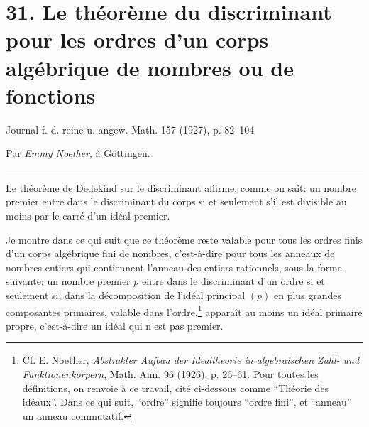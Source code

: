 \setcounter{footnote}{0}

\providecommand{\ma}{\mathfrak a}
\providecommand{\mb}{\mathfrak b}
\providecommand{\mc}{\mathfrak c}
\providecommand{\mo}{\mathfrak o}
\providecommand{\mO}{\mathfrak O}
\providecommand{\mP}{\mathfrak P}
\providecommand{\mR}{\mathfrak R}
\providecommand{\mT}{\mathfrak T}
\providecommand{\mX}{\mathfrak X}
\providecommand{\mZ}{\mathfrak Z}
\providecommand{\mq}{\mathfrak q}
\providecommand{\mt}{\mathfrak t}
\providecommand{\mpideal}{\mathfrak p}
\providecommand{\ba}{\overline{\mathfrak a}}
\providecommand{\bp}{\overline{\mathfrak p}}
\providecommand{\bP}{\overline P}
\providecommand{\bR}{\overline{\mathfrak R}}

\section*{31. Le théorème du discriminant pour les ordres d'un corps algébrique de nombres ou de fonctions}

\begin{center}
Journal f. d. reine u. angew. Math. 157 (1927), p. 82--104

Par \emph{Emmy Noether}, à Göttingen.\\[0.4em]
\rule{9em}{0.4pt}
\end{center}

Le théorème de Dedekind sur le discriminant affirme, comme on sait: un nombre premier entre dans le discriminant du corps si et seulement s'il est divisible au moins par le carré d'un idéal premier.

Je montre dans ce qui suit que ce théorème reste valable pour tous les ordres finis d'un corps algébrique fini de nombres, c'est-à-dire pour tous les anneaux de nombres entiers qui contiennent l'anneau des entiers rationnels, sous la forme suivante: un nombre premier $p$ entre dans le discriminant d'un ordre si et seulement si, dans la décomposition de l'idéal principal $(p)$ en plus grandes composantes primaires, valable dans l'ordre,\footnote{Cf. E. Noether, \emph{Abstrakter Aufbau der Idealtheorie in algebraischen Zahl- und Funktionenkörpern}, Math. Ann. 96 (1926), p. 26--61. Pour toutes les définitions, on renvoie à ce travail, cité ci-dessous comme ``Théorie des idéaux''. Dans ce qui suit, ``ordre'' signifie toujours ``ordre fini'', et ``anneau'' un anneau commutatif.} apparaît au moins un idéal primaire propre, c'est-à-dire un idéal qui n'est pas premier.

